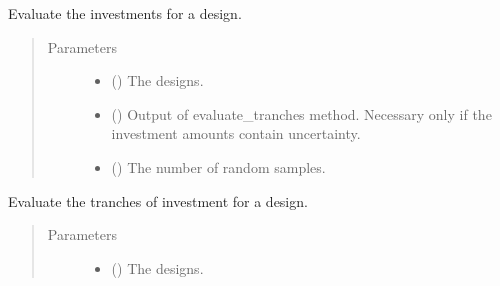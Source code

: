 \documentclass[letterpaper,10pt,english]{sphinxmanual}
\begin{document}
\begin{fulllineitems}
\begin{fulllineitems}
\end{fulllineitems}


\begin{fulllineitems}
\label{\detokenize{tyche:tyche.Investments.Investments.evaluate_investments}}
Evaluate the investments for a design.
\begin{quote}\begin{description}
\item[{Parameters}] \leavevmode\begin{itemize}
\item {} 
 () \textendash{} The designs.

\item {} 
 () \textendash{} Output of evaluate\_tranches method. Necessary only if the investment amounts contain uncertainty.

\item {} 
 () \textendash{} The number of random samples.

\end{itemize}

\end{description}\end{quote}

\end{fulllineitems}


\begin{fulllineitems}
\label{\detokenize{tyche:tyche.Investments.Investments.evaluate_tranches}}
Evaluate the tranches of investment for a design.
\begin{quote}\begin{description}
\item[{Parameters}] \leavevmode\begin{itemize}
\item {} 
 () \textendash{} The designs.


\end{itemize}
\end{description}
\end{quote}
\end{fulllineitems}
\end{fulllineitems}
\end{document}

